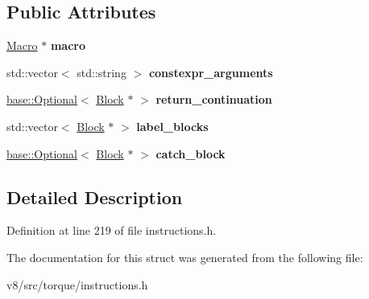 \subsection*{Public Attributes}
\begin{DoxyCompactItemize}
\item 
\mbox{\label{structv8_1_1internal_1_1torque_1_1CallCsaMacroAndBranchInstruction_a04d00d99fe00bc1ebfc41ffa36859f22}} 
\mbox{\hyperlink{classv8_1_1internal_1_1torque_1_1Macro}{Macro}} $\ast$ {\bfseries macro}
\item 
\mbox{\label{structv8_1_1internal_1_1torque_1_1CallCsaMacroAndBranchInstruction_a417cd353308962ff7ab7f478438bfc6e}} 
std\+::vector$<$ std\+::string $>$ {\bfseries constexpr\+\_\+arguments}
\item 
\mbox{\label{structv8_1_1internal_1_1torque_1_1CallCsaMacroAndBranchInstruction_a2c2602779dde9a97ae81bf61aaf3ba32}} 
\mbox{\hyperlink{classv8_1_1base_1_1Optional}{base\+::\+Optional}}$<$ \mbox{\hyperlink{classv8_1_1internal_1_1torque_1_1Block}{Block}} $\ast$ $>$ {\bfseries return\+\_\+continuation}
\item 
\mbox{\label{structv8_1_1internal_1_1torque_1_1CallCsaMacroAndBranchInstruction_a2f132043c3446daaf590a9abdbb476b3}} 
std\+::vector$<$ \mbox{\hyperlink{classv8_1_1internal_1_1torque_1_1Block}{Block}} $\ast$ $>$ {\bfseries label\+\_\+blocks}
\item 
\mbox{\label{structv8_1_1internal_1_1torque_1_1CallCsaMacroAndBranchInstruction_a25d2b7ef9dcca6fe4d6afef0601c2f5c}} 
\mbox{\hyperlink{classv8_1_1base_1_1Optional}{base\+::\+Optional}}$<$ \mbox{\hyperlink{classv8_1_1internal_1_1torque_1_1Block}{Block}} $\ast$ $>$ {\bfseries catch\+\_\+block}
\end{DoxyCompactItemize}


\subsection{Detailed Description}


Definition at line 219 of file instructions.\+h.



The documentation for this struct was generated from the following file\+:\begin{DoxyCompactItemize}
\item 
v8/src/torque/instructions.\+h\end{DoxyCompactItemize}
